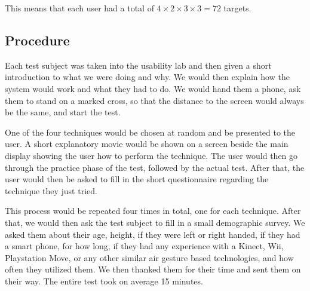 This means that each user had a total of $4 \times 2 \times 3 \times 3 = 72 $ targets.

\subsection{Procedure}

Each test subject was taken into the usability lab and then given a short introduction to what we were doing and why. 
We would then explain how the system would work and what they had to do. 
We would hand them a phone, ask them to stand on a marked cross, so that the distance to the screen would always be the same, and start the test.

One of the four techniques would be chosen at random and be presented to the user. 
A short explanatory movie would be shown on a screen beside the main display showing the user how to perform the technique. 
The user would then go through the practice phase of the test, followed by the actual test. 
After that, the user would then be asked to fill in the short questionnaire regarding the technique they just tried. 

This process would be repeated four times in total, one for each technique. 
After that, we would then ask the test subject to fill in a small demographic survey. 
We asked them about their age, height, if they were left or right handed, if they had a smart phone, for how long, if they had any experience with a Kinect, Wii, Playstation Move, or any other similar air gesture based technologies, and how often they utilized them. 
We then thanked them for their time and sent them on their way. 
The entire test took on average 15 minutes. 